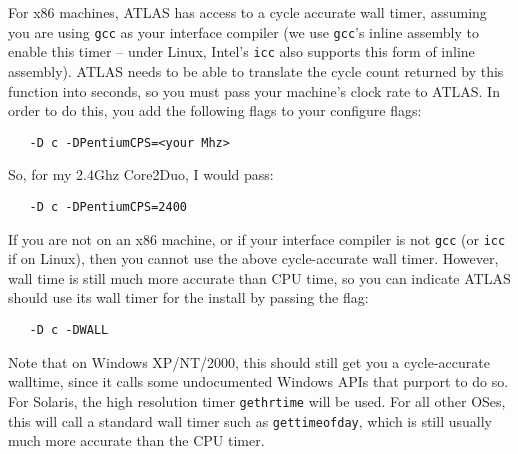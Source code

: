 \documentclass[11pt]{article}
\begin{document}
For x86 machines, ATLAS has access to a cycle accurate wall timer, assuming
you are using {\tt gcc} as your interface compiler (we use {\tt gcc}'s inline
assembly to enable this timer -- under Linux, Intel's {\tt icc} also supports
this form of inline
assembly).  ATLAS needs to be able to translate the cycle count returned by
this function into seconds, so you must pass your machine's clock rate to
ATLAS.  In order to do this, you add the following flags to your 
configure flags:
\vspace*{-0.1in}
\begin{verbatim}
   -D c -DPentiumCPS=<your Mhz>
\end{verbatim}
So, for my 2.4Ghz Core2Duo, I would pass:
\vspace*{-0.1in}
\begin{verbatim}
   -D c -DPentiumCPS=2400
\end{verbatim}

If you are not on an x86 machine, or if your interface compiler is not {\tt gcc}
(or {\tt icc} if on Linux), then you cannot use the above cycle-accurate
wall timer.  However, wall time is still much more accurate than CPU time,
so you can indicate ATLAS should use its wall timer for the install by passing
the flag:
\vspace*{-0.1in}
\begin{verbatim}
   -D c -DWALL
\end{verbatim}

Note that on Windows XP/NT/2000, this should still get you a cycle-accurate
walltime, since it calls some undocumented Windows APIs that purport to do so. 
For Solaris, the high resolution timer {\tt gethrtime} will be used.  For
all other OSes, this will call a standard wall timer such as {\tt gettimeofday},
which is still usually much more accurate than the CPU timer.
\end{document}
